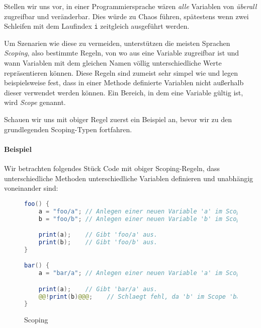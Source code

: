 
Stellen wir uns vor, in einer Programmiersprache wären \textit{alle} Variablen von \textit{überall} zugreifbar und veränderbar. Dies würde zu Chaos führen, spätestens wenn zwei Schleifen mit dem Laufindex \texttt{i} zeitgleich ausgeführt werden.

Um Szenarien wie diese zu vermeiden, unterstützen die meisten Sprachen \textit{Scoping}, also bestimmte Regeln, von wo aus eine Variable zugreifbar ist und wann Variablen mit dem gleichen Namen völlig unterschiedliche Werte repräsentieren können. Diese Regeln sind zumeist sehr simpel wie und legen beispielsweise fest, dass in einer Methode definierte Variablen nicht außerhalb dieser verwendet werden können. Ein Bereich, in dem eine Variable gültig ist, wird \textit{Scope} genannt.

Schauen wir uns mit obiger Regel zuerst ein Beispiel an, bevor wir zu den grundlegenden Scoping-Typen fortfahren.

\paragraph{Beispiel}
	Wir betrachten folgendes Stück Code mit obiger Scoping-Regeln, dass unterschiedliche Methoden unterschiedliche Variablen definieren und unabhängig voneinander sind:
	\begin{figure}[H]
		\centering
		\begin{lstlisting}[language = Java, style = base]
foo() {
	a = "foo/a"; // Anlegen einer neuen Variable 'a' im Scope 'foo'.
	b = "foo/b"; // Anlegen einer neuen Variable 'b' im Scope 'foo'.

	print(a);    // Gibt 'foo/a' aus.
	print(b);    // Gibt 'foo/b' aus.
}

bar() {
	a = "bar/a"; // Anlegen einer neuen Variable 'a' im Scope 'bar', von 'foo' unabhaengig.

	print(a);    // Gibt 'bar/a' aus.
	@@!print(b)@@@;    // Schlaegt fehl, da 'b' im Scope 'bar' nicht definiert ist.
}
		\end{lstlisting}
		\caption{Scoping}
	\end{figure}

